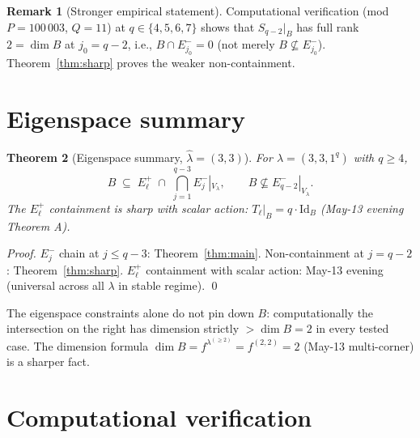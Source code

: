 \documentclass[11pt]{article}
\newtheorem{theorem}{Theorem}
\theoremstyle{definition}
\newtheorem{remark}[theorem]{Remark}
\newcommand{\hatl}{\widehat\lambda}
\begin{document}
\begin{remark}[Stronger empirical statement]\label{rem:stronger-sharp}
Computational verification (mod $P = 100\,003$, $Q = 11$) at $q \in
\{4, 5, 6, 7\}$ shows that $S_{q-2}|_B$ has full rank $2 = \dim B$ at
$j_0 = q - 2$, i.e., $B \cap E_{j_0}^- = 0$ (not merely $B \not\subseteq
E_{j_0}^-$).  Theorem~\ref{thm:sharp} proves the weaker non-containment.
\end{remark}

\section{Eigenspace summary}\label{sec:summary}

\begin{theorem}[Eigenspace summary, $\hatl = (3, 3)$]\label{thm:summary}
For $\lambda = (3, 3, 1^q)$ with $q \ge 4$,
\[
   B \;\subseteq\; E_\ell^+\;\cap\;\bigcap_{j=1}^{q-3} E_j^-|_{V_\lambda},
   \qquad
   B \not\subseteq E_{q-2}^-|_{V_\lambda}.
\]
The $E_\ell^+$ containment is sharp with scalar action: $T_\ell|_B
= q\cdot \mathrm{Id}_B$ (May-13 evening Theorem A).
\end{theorem}

\begin{proof}
$E_j^-$ chain at $j \le q - 3$: Theorem~\ref{thm:main}.
Non-containment at $j = q - 2$: Theorem~\ref{thm:sharp}.
$E_\ell^+$ containment with scalar action: May-13 evening (universal
across all $\lambda$ in stable regime).
\qed
\end{proof}

The eigenspace constraints alone do not pin down $B$: computationally
the intersection on the right has dimension strictly $> \dim B = 2$
in every tested case.  The dimension formula $\dim B = f^{\lambda^{(\ge 2)}}
= f^{(2, 2)} = 2$ (May-13 multi-corner) is a sharper fact.

\section{Computational verification}\label{sec:verify}
\end{document}
